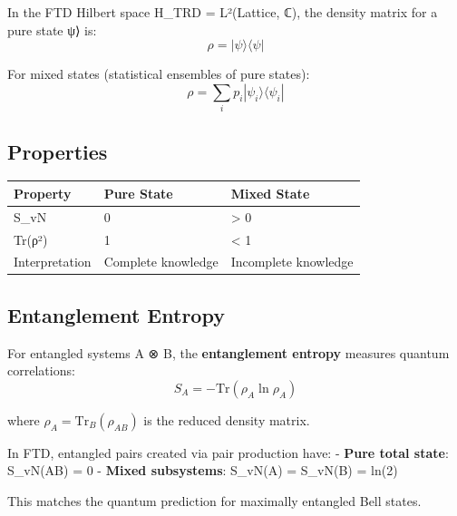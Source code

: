 \documentclass[
  11pt,
  letterpaper,
  twoside,
  openright]{book}
\begin{document}
In the FTD Hilbert space H\_TRD = L²(Lattice, ℂ), the density matrix for
a pure state \textbar ψ⟩ is: \[
\rho = |\psi\rangle\langle\psi|
\]

For mixed states (statistical ensembles of pure states): \[
\rho = \sum_i p_i |\psi_i\rangle\langle\psi_i|
\]

\subsection{Properties}\label{properties-22}

\begin{longtable}[]{@{}lll@{}}
\toprule\noalign{}
Property & Pure State & Mixed State \\
\midrule\noalign{}
\endhead
\bottomrule\noalign{}
\endlastfoot
S\_vN & 0 & \textgreater{} 0 \\
Tr(ρ²) & 1 & \textless{} 1 \\
Interpretation & Complete knowledge & Incomplete knowledge \\
\end{longtable}

\subsection{Entanglement Entropy}\label{entanglement-entropy}

For entangled systems A ⊗ B, the \textbf{entanglement entropy} measures
quantum correlations: \[
S_A = -\text{Tr}(\rho_A \ln \rho_A)
\]

where \(\rho_A = \text{Tr}_B(\rho_{AB})\) is the reduced density matrix.

\begin{tcolorbox}[enhanced jigsaw, coltitle=black, colbacktitle=quarto-callout-note-color!10!white, toprule=.15mm, colframe=quarto-callout-note-color-frame, arc=.35mm, opacityback=0, bottomtitle=1mm, toptitle=1mm, breakable, colback=white, titlerule=0mm, opacitybacktitle=0.6, title=\textcolor{quarto-callout-note-color}{\faInfo}\hspace{0.5em}{FTD Connection}, rightrule=.15mm, bottomrule=.15mm, leftrule=.75mm, left=2mm]

In FTD, entangled pairs created via pair production have: - \textbf{Pure
total state}: S\_vN(AB) = 0 - \textbf{Mixed subsystems}: S\_vN(A) =
S\_vN(B) = ln(2)

This matches the quantum prediction for maximally entangled Bell states.

\end{tcolorbox}
\end{document}
